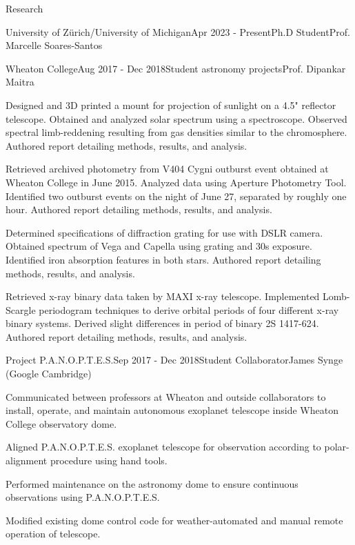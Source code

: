 \documentclass{resume} %
\begin{document}
\begin{rSection}{Research}
\begin{rSubsection}{University of Zürich/University of Michigan}{Apr 2023 - Present}{Ph.D Student}{Prof. Marcelle Soares-Santos}
\begin{rSubsection}{Wheaton College}{Aug 2017 - Dec 2018}{Student astronomy projects}{Prof. Dipankar Maitra}
\item Designed and 3D printed a mount for projection of sunlight on a 4.5" reflector telescope. Obtained and analyzed solar spectrum using a spectroscope. Observed spectral limb-reddening resulting from gas densities similar to the chromosphere. Authored report detailing methods, results, and analysis.
\item Retrieved archived photometry from V404 Cygni outburst event obtained at Wheaton College in June 2015. Analyzed data using Aperture Photometry Tool. Identified two outburst events on the night of June 27, separated by roughly one hour. Authored report detailing methods, results, and analysis.
\item Determined specifications of diffraction grating for use with DSLR camera. Obtained spectrum of Vega and Capella using grating and 30s exposure. Identified iron absorption features in both stars. Authored report detailing methods, results, and analysis.
\item Retrieved x-ray binary data taken by MAXI x-ray telescope. Implemented Lomb-Scargle periodogram techniques to derive orbital periods of four different x-ray binary systems. Derived slight differences in period of binary 2S 1417-624. Authored report detailing methods, results, and analysis.
\end{rSubsection}

\begin{rSubsection}{Project P.A.N.O.P.T.E.S.}{Sep 2017 - Dec 2018}{Student Collaborator}{James Synge (Google Cambridge)}
\item Communicated between professors at Wheaton and outside collaborators to install, operate, and maintain autonomous exoplanet telescope inside Wheaton College observatory dome.
\item Aligned P.A.N.O.P.T.E.S. exoplanet telescope for observation according to polar-alignment procedure using hand tools.
\item Performed maintenance on the astronomy dome to ensure continuous observations using P.A.N.O.P.T.E.S.
\item Modified existing dome control code for weather-automated and manual remote operation of telescope.
\end{rSubsection}


\end{rSubsection}
\end{rSection}
\end{document}
